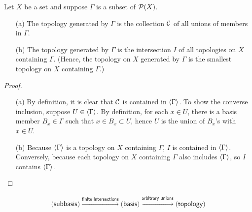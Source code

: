 \begin{prop}
    Let $X$ be a set and suppose $\Gamma$ is a subset of ${\mathcal{P}}(X)$.
    \begin{enumerate}
        \item[(a)]
            The topology generated by $\Gamma$ is the collection ${\mathcal{C}}$ of all unions of members in $\Gamma$.
        \item[(b)]
            The topology generated by $\Gamma$ is the intersection $I$ of all topologies on $X$ containing $\Gamma$. (Hence, the topology on $X$ generated by $\Gamma$ is the smallest topology on $X$ containing $\Gamma$.)
    \end{enumerate}
\end{prop}
\begin{proof}
    \begin{enumerate}
        \item[(a)]
            By definition, it is clear that ${\mathcal{C}}$ is contained in ${\left\langle{\Gamma}\right\rangle}$.
            To show the converse inclusion, suppose $U\in{\left\langle{\Gamma}\right\rangle}$.
            By definition, for each $x\in U$, there is a basis member $B_x\in\Gamma$ such that $x\in B_x\subset U$, hence $U$ is the union of $B_x$'s with $x\in U$.
        \item[(b)]
            Because ${\left\langle{\Gamma}\right\rangle}$ is a topology on $X$ containing $\Gamma$, $I$ is contained in ${\left\langle{\Gamma}\right\rangle}$.
            Conversely, because each topology on $X$ containing $\Gamma$ also includes ${\left\langle{\Gamma}\right\rangle}$, so $I$ contains ${\left\langle{\Gamma}\right\rangle}$.
    \end{enumerate}
\end{proof}

\begin{rmk}
    \begin{align*}
        \textsf{(subbasis)}\xrightarrow{\textsf{finite intersections}}
        \textsf{(basis)}\xrightarrow{\textsf{arbitrary unions}}
        \textsf{(topology)}
    \end{align*}
\end{rmk}